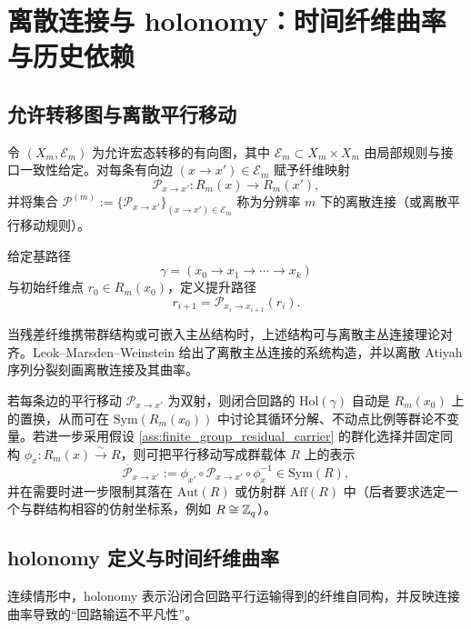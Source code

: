 \section{离散连接与 holonomy：时间纤维曲率与历史依赖}

\subsection{允许转移图与离散平行移动}

\begin{definition}\label{def:discrete_connection}
\MathTag 令 $(X_m,\mathcal E_m)$ 为允许宏态转移的有向图，其中 $\mathcal E_m\subset X_m\times X_m$ 由局部规则与接口一致性给定。对每条有向边 $(x\to x')\in\mathcal E_m$ 赋予纤维映射
$$
\mathcal P_{x\to x'}:R_m(x)\to R_m(x'),
$$
并将集合 $\mathcal P^{(m)}:=\{\mathcal P_{x\to x'}\}_{(x\to x')\in\mathcal E_m}$ 称为分辨率 $m$ 下的离散连接（或离散平行移动规则）。
\end{definition}

给定基路径
$$
\gamma=(x_0\to x_1\to\cdots\to x_k)
$$
与初始纤维点 $r_0\in R_m(x_0)$，定义提升路径
$$
r_{i+1}=\mathcal P_{x_i\to x_{i+1}}(r_i).
$$

当残差纤维携带群结构或可嵌入主丛结构时，上述结构可与离散主丛连接理论对齐。Leok--Marsden--Weinstein 给出了离散主丛连接的系统构造，并以离散 Atiyah 序列分裂刻画离散连接及其曲率。\cite{leok_marsden_weinstein_discrete_connections}

\begin{remark}[可逆平行移动与置换表示]\label{rem:bijective-parallel-transport}
若每条边的平行移动 $\mathcal P_{x\to x'}$ 为双射，则闭合回路的 $\mathrm{Hol}(\gamma)$ 自动是 $R_m(x_0)$ 上的置换，从而可在 $\mathrm{Sym}(R_m(x_0))$ 中讨论其循环分解、不动点比例等群论不变量。若进一步采用假设 \ref{ass:finite_group_residual_carrier} 的群化选择并固定同构 $\phi_x:R_m(x)\xrightarrow{\sim}R$，则可把平行移动写成群载体 $R$ 上的表示
$$
\overline{\mathcal P}_{x\to x'}:=\phi_{x'}\circ \mathcal P_{x\to x'}\circ \phi_x^{-1}\in \mathrm{Sym}(R),
$$
并在需要时进一步限制其落在 $\mathrm{Aut}(R)$ 或仿射群 $\mathrm{Aff}(R)$ 中（后者要求选定一个与群结构相容的仿射坐标系，例如 $R\cong \mathbb{Z}_q$）。
\end{remark}

\subsection{holonomy 定义与时间纤维曲率}

连续情形中，holonomy 表示沿闭合回路平行运输得到的纤维自同构，并反映连接曲率导致的“回路输运不平凡性”。\cite{wikipedia_holonomy}

